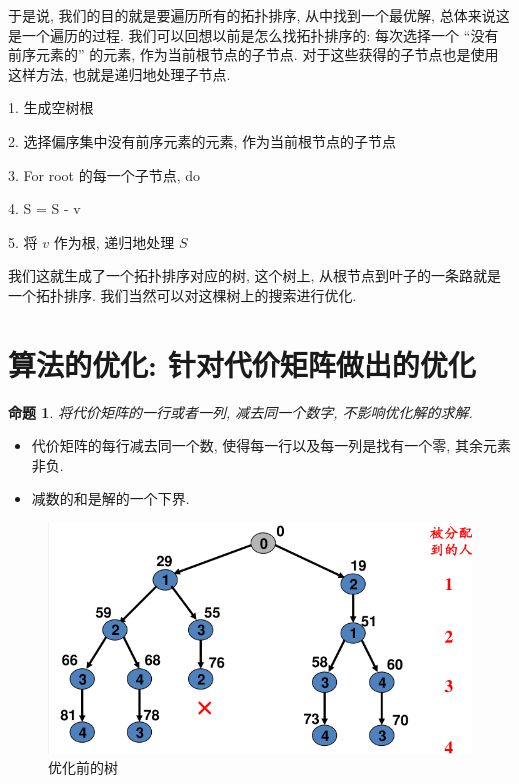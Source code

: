 \documentclass[a4paper, 10pt]{ctexbook} %
\newtheorem{proposition}{命题}
\begin{document}
于是说, 我们的目的就是要遍历所有的拓扑排序, 从中找到一个最优解, 总体来说这是一个遍历的过程. 我们可以回想以前是怎么找拓扑排序的: 每次选择一个 ``没有前序元素的'' 的元素, 作为当前根节点的子节点. 
对于这些获得的子节点也是使用这样方法, 也就是递归地处理子节点. 

1.  生成空树根 

2. 选择偏序集中没有前序元素的元素, 作为当前根节点的子节点

3. For root 的每一个子节点, do 

4. S =     S - {v}

5.  将 $v$ 作为根, 递归地处理 $S$

我们这就生成了一个拓扑排序对应的树, 这个树上, 从根节点到叶子的一条路就是一个拓扑排序. 我们当然可以对这棵树上的搜索进行优化. 
\section{算法的优化: 针对代价矩阵做出的优化}
\begin{proposition}
    将代价矩阵的一行或者一列, 减去同一个数字, 不影响优化解的求解.
\end{proposition}
\begin{itemize}
    \item 代价矩阵的每行减去同一个数, 使得每一行以及每一列是找有一个零, 其余元素非负. 
    \item 减数的和是解的一个下界. 
\end{itemize}    

\begin{figure}
    \centering
    \includegraphics[scale = 0.5]{ss3.png}
    \caption{优化前的树}
\end{figure}
\end{document}
